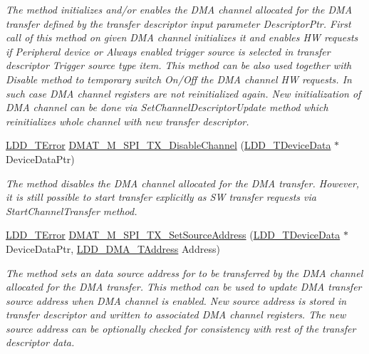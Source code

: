 \begin{DoxyCompactItemize}
\begin{DoxyCompactList}\small\item\em The method initializes and/or enables the D\-M\-A channel allocated for the D\-M\-A transfer defined by the transfer descriptor input parameter Descriptor\-Ptr. First call of this method on given D\-M\-A channel initializes it and enables H\-W requests if Peripheral device or Always enabled trigger source is selected in transfer descriptor Trigger source type item. This method can be also used together with Disable method to temporary switch On/\-Off the D\-M\-A channel H\-W requests. In such case D\-M\-A channel registers are not reinitialized again. New initialization of D\-M\-A channel can be done via Set\-Channel\-Descriptor\-Update method which reinitializes whole channel with new transfer descriptor. \end{DoxyCompactList}\item 
\hyperlink{group___p_e___types__module_ga24c2b045fd04e79e85f261ce4df35588}{L\-D\-D\-\_\-\-T\-Error} \hyperlink{group___d_m_a_t___m___s_p_i___t_x__module_gada4a924c19293a09528edcee718297cc}{D\-M\-A\-T\-\_\-\-M\-\_\-\-S\-P\-I\-\_\-\-T\-X\-\_\-\-Disable\-Channel} (\hyperlink{group___p_e___types__module_gac5cf1362f1f0e3a2ce71b1bf2276d091}{L\-D\-D\-\_\-\-T\-Device\-Data} $\ast$Device\-Data\-Ptr)
\begin{DoxyCompactList}\small\item\em The method disables the D\-M\-A channel allocated for the D\-M\-A transfer. However, it is still possible to start transfer explicitly as S\-W transfer requests via Start\-Channel\-Transfer method. \end{DoxyCompactList}\item 
\hyperlink{group___p_e___types__module_ga24c2b045fd04e79e85f261ce4df35588}{L\-D\-D\-\_\-\-T\-Error} \hyperlink{group___d_m_a_t___m___s_p_i___t_x__module_gaf2a9fc998d2ddfc4dbf775a58dd27beb}{D\-M\-A\-T\-\_\-\-M\-\_\-\-S\-P\-I\-\_\-\-T\-X\-\_\-\-Set\-Source\-Address} (\hyperlink{group___p_e___types__module_gac5cf1362f1f0e3a2ce71b1bf2276d091}{L\-D\-D\-\_\-\-T\-Device\-Data} $\ast$Device\-Data\-Ptr, \hyperlink{group___p_e___types__module_gab8287f62db7ff96992355760b652cd07}{L\-D\-D\-\_\-\-D\-M\-A\-\_\-\-T\-Address} Address)
\begin{DoxyCompactList}\small\item\em The method sets an data source address for to be transferred by the D\-M\-A channel allocated for the D\-M\-A transfer. This method can be used to update D\-M\-A transfer source address when D\-M\-A channel is enabled. New source address is stored in transfer descriptor and written to associated D\-M\-A channel registers. The new source address can be optionally checked for consistency with rest of the transfer descriptor data. \end{DoxyCompactList}\item 

\end{DoxyCompactItemize}
